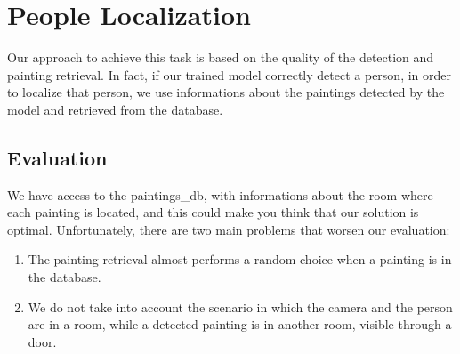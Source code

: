 \section{People Localization}
Our approach to achieve this task is based on the quality of the detection and painting retrieval. In fact, if our trained model correctly detect a person, in order to localize that person, we use informations about the paintings detected by the model and retrieved from the database.

\subsection{Evaluation}
We have access to the paintings\_db, with informations about the room where each painting is located, and this could make you think that our solution is optimal. Unfortunately, there are two main problems that worsen our evaluation:

\begin{enumerate}[label=\alph*)]
	\item \label{retrieval_case} The painting retrieval almost performs a random choice when a painting is in the database.
    \item \label{painting_other_room} We do not take into account the scenario in which the camera and the person are in a room, while a detected painting is in another room, visible through a door.
\end{enumerate}